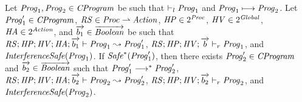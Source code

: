 \begin{lemma}
Let $\mathit{Prog}_1,\mathit{Prog}_2 \in \mathit{CProgram}$ be such that $\vdash_l \mathit{Prog}_1$ and $\mathit{Prog}_1 \longmapsto \mathit{Prog}_2$.
Let $\mathit{Prog}'_1 \in \mathit{CProgram}$, $\mathit{RS} \in \mathit{Proc} \rightharpoonup \mathit{Action}$, $\mathit{HP} \in 2^{\mathit{Proc}}$, $\mathit{HV} \in 2^{\mathit{Global}}$, $\mathit{HA} \in 2^{\mathit{Action}}$,
and $\overrightarrow{b_1} \in \overrightarrow{\mathit{Boolean}}$ be such that 
$\mathit{RS};\mathit{HP};\mathit{HV};\mathit{HA};\overrightarrow{b_1} \vdash \mathit{Prog}_1 \leadsto \mathit{Prog}'_1$, $\mathit{RS};\mathit{HP};\mathit{HV};\overrightarrow{b} \vdash_r \mathit{Prog}_1$, and
$\mathit{InterferenceSafe}(\mathit{Prog}_1)$.
If $\mathit{Safe}^*(\mathit{Prog}'_1)$, then there exists $\mathit{Prog}'_2 \in \mathit{CProgram}$ and $\overrightarrow{b_2} \in \overrightarrow{\mathit{Boolean}}$ such that 
$\mathit{Prog}'_1 \longrightarrow^* \mathit{Prog}'_2$, $\mathit{RS};\mathit{HP};\mathit{HV};\mathit{HA};\overrightarrow{b_2} \vdash \mathit{Prog}_2 \leadsto \mathit{Prog}'_2$, 
$\mathit{RS};\mathit{HP};\mathit{HV};\overrightarrow{b_2} \vdash_r \mathit{Prog}_2$, and $\mathit{InterferenceSafe}(\mathit{Prog}_2)$.
\end{lemma}



